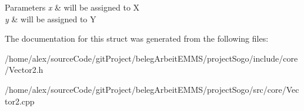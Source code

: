 \begin{DoxyParams}{Parameters}
{\em x} & will be assigned to X \\
\hline
{\em y} & will be assigned to Y \\
\hline
\end{DoxyParams}


The documentation for this struct was generated from the following files\-:\begin{DoxyCompactItemize}
\item 
/home/alex/source\-Code/git\-Project/beleg\-Arbeit\-E\-M\-M\-S/project\-Sogo/include/core/Vector2.\-h\item 
/home/alex/source\-Code/git\-Project/beleg\-Arbeit\-E\-M\-M\-S/project\-Sogo/src/core/Vector2.\-cpp\end{DoxyCompactItemize}

